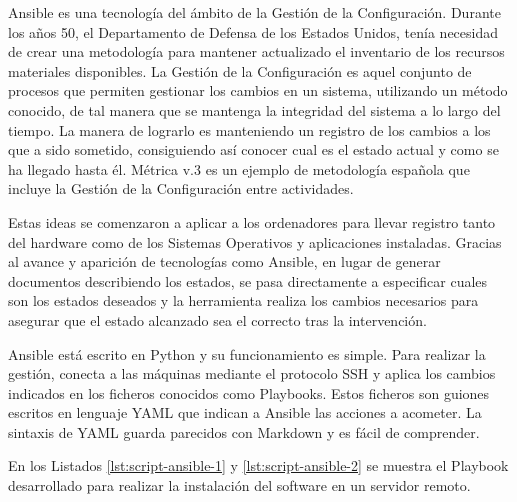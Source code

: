 Ansible es una tecnología del ámbito de la Gestión de la Configuración. Durante los años 50, el Departamento de Defensa de los Estados Unidos, tenía necesidad de crear una metodología para mantener actualizado el inventario de los recursos materiales disponibles. La Gestión de la Configuración es aquel conjunto de procesos que permiten gestionar los cambios en un sistema, utilizando un método conocido, de tal manera que se mantenga la integridad del sistema a lo largo del tiempo. La manera de lograrlo es manteniendo un registro de los cambios a los que a sido sometido, consiguiendo así conocer cual es el estado actual y como se ha llegado hasta él. Métrica v.3 es un ejemplo de metodología española que incluye la Gestión de la Configuración entre actividades.

Estas ideas se comenzaron a aplicar a los ordenadores para llevar registro tanto del hardware como de los Sistemas Operativos y aplicaciones instaladas. Gracias al avance y aparición de tecnologías como Ansible, en lugar de generar documentos describiendo los estados, se pasa directamente a especificar cuales son los estados deseados y la herramienta realiza los cambios necesarios para asegurar que el estado alcanzado sea el correcto tras la intervención.

Ansible está escrito en Python y su funcionamiento es simple. Para realizar la gestión, conecta a las máquinas mediante el protocolo SSH y aplica los cambios indicados en los ficheros conocidos como Playbooks. Estos ficheros son guiones escritos en lenguaje YAML que indican a Ansible las acciones a acometer. La sintaxis de YAML guarda parecidos con Markdown y es fácil de comprender.

En los Listados \ref{lst:script-ansible-1} y \ref{lst:script-ansible-2} se muestra el Playbook desarrollado para realizar la instalación del software en un servidor remoto.

